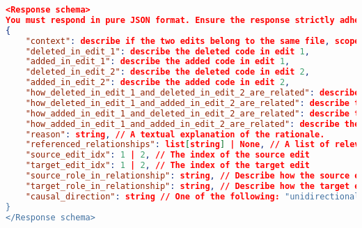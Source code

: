 \begin{lstlisting}[language=json, basicstyle=\fontsize{8}{10}\selectfont\ttfamily]
<Response schema>
You must respond in pure JSON format. Ensure the response strictly adheres to the following schema:
{   
    "context": describe if the two edits belong to the same file, scope or block, and if any, affects the relationship between the two edits, Make use of the static information provided.
    "deleted_in_edit_1": describe the deleted code in edit 1,
    "added_in_edit_1": describe the added code in edit 1,
    "deleted_in_edit_2": describe the deleted code in edit 2,
    "added_in_edit_2": describe the added code in edit 2,
    "how_deleted_in_edit_1_and_deleted_in_edit_2_are_related": describe the relationship between the deleted code in edit 1 and the deleted code in edit 2,
    "how_deleted_in_edit_1_and_added_in_edit_2_are_related": describe the relationship between the deleted code in edit 1 and the added code in edit 2,
    "how_added_in_edit_1_and_deleted_in_edit_2_are_related": describe the relationship between the added code in edit 1 and the deleted code in edit 2,
    "how_added_in_edit_1_and_added_in_edit_2_are_related": describe the relationship between the added code in edit 1 and the added code in edit 2,
    "reason": string, // A textual explanation of the rationale.
    "referenced_relationships": list[string] | None, // A list of relevant relationships. You may add your own relationships if applicable.
    "source_edit_idx": 1 | 2, // The index of the source edit
    "target_edit_idx": 1 | 2, // The index of the target edit
    "source_role_in_relationship": string, // Describe how the source edit is involved in the relationship
    "target_role_in_relationship": string, // Describe how the target edit is involved in the relationship
    "causal_direction": string // One of the following: "unidirectional, "no_relation", "bidirectional"
}
</Response schema>


\end{lstlisting}
